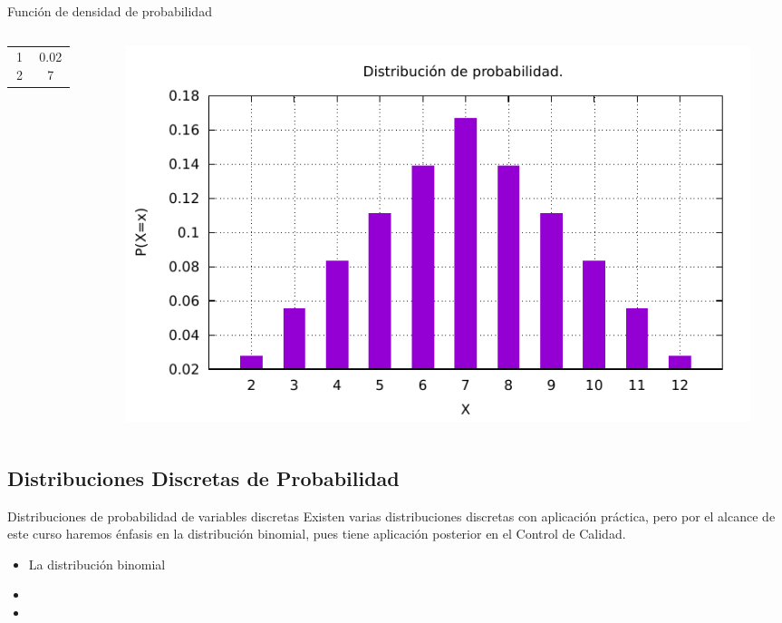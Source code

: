 \documentclass[11pt]{beamer}
\begin{document}
\begin{frame}{Función de densidad de probabilidad}
\begin{columns}
\begin{column}{0.4\textwidth}
\begin{center}
\begin{tabular}{c|c}
                            12 & 0.027 \\
                        \end{tabular}
                    \end{center}
                \end{column}
                \begin{column}{0.56\textwidth}
                    \begin{figure}
                        \centering
                        \includegraphics[width=1\linewidth]{images/p1}
                        \label{fig:p1}
                    \end{figure}
                \end{column}
            \end{columns}
        \end{frame}

      \subsection*{Distribuciones Discretas de Probabilidad}

        \begin{frame}{Distribuciones de probabilidad de variables discretas}
          Existen varias distribuciones discretas con aplicación práctica, pero por el alcance de este curso haremos énfasis en la distribución binomial, pues tiene aplicación posterior en el Control de Calidad.
          \begin{itemize}
              \item La distribución binomial
              \item
              \item
          \end{itemize}
        \end{frame}
\end{document}
